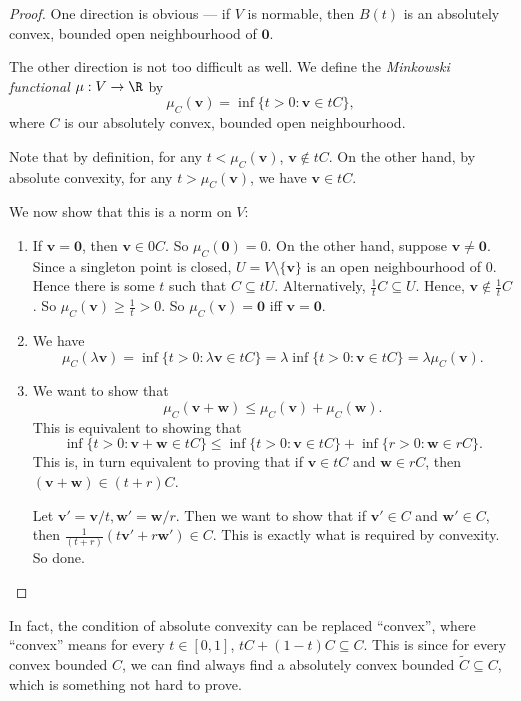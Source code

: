 \documentclass[a4paper]{article}
\begin{document}
\begin{proof}
  One direction is obvious --- if $V$ is normable, then $B(t)$ is an absolutely convex, bounded open neighbourhood of $\mathbf{0}$.

  The other direction is not too difficult as well. We define the \emph{Minkowski functional} $\mu: V \to \R$ by
  \[
    \mu_C(\mathbf{v}) = \inf \{t > 0: \mathbf{v}\in tC\},
  \]
  where $C$ is our absolutely convex, bounded open neighbourhood.

  Note that by definition, for any $t < \mu_C(\mathbf{v})$, $\mathbf{v}\not\in tC$. On the other hand, by absolute convexity, for any $t > \mu_C(\mathbf{v})$, we have $\mathbf{v}\in tC$.

  We now show that this is a norm on $V$:
  \begin{enumerate}
    \item If $\mathbf{v} = \mathbf{0}$, then $\mathbf{v}\in 0C$. So $\mu_C(\mathbf{0}) = 0$. On the other hand, suppose $\mathbf{v} \not= \mathbf{0}$. Since a singleton point is closed, $U = V\setminus \{\mathbf{v}\}$ is an open neighbourhood of $0$. Hence there is some $t$ such that $C\subseteq tU$. Alternatively, $\frac{1}{t}C \subseteq U$. Hence, $\mathbf{v}\not\in \frac{1}{t}C$. So $\mu_C (\mathbf{v}) \geq \frac{1}{t} > 0$. So $\mu_C (\mathbf{v}) = \mathbf{0}$ iff $\mathbf{v} = \mathbf{0}$.

    \item We have
      \[
        \mu_C(\lambda \mathbf{v}) = \inf \{t> 0: \lambda \mathbf{v}\in tC\} = \lambda \inf \{t > 0: \mathbf{v}\in tC\} = \lambda \mu_C(\mathbf{v}).
      \]
    \item We want to show that
      \[
        \mu_C (\mathbf{v} + \mathbf{w}) \leq \mu_C(\mathbf{v}) + \mu_C(\mathbf{w}).
      \]
      This is equivalent to showing that
      \[
        \inf\{t > 0: \mathbf{v} + \mathbf{w} \in tC\} \leq \inf\{t > 0: \mathbf{v}\in tC\} + \inf\{r > 0: \mathbf{w}\in rC\}.
      \]
      This is, in turn equivalent to proving that if $\mathbf{v}\in tC$ and $\mathbf{w}\in rC$, then $(\mathbf{v} + \mathbf{w})\in (t + r)C$.

      Let $\mathbf{v}' = \mathbf{v}/t, \mathbf{w}' = \mathbf{w}/r$. Then we want to show that if $\mathbf{v}' \in C$ and $\mathbf{w}' \in C$, then $\frac{1}{(t + r)}(t \mathbf{v}' + r \mathbf{w}') \in C$. This is exactly what is required by convexity. So done.\qedhere
  \end{enumerate}
\end{proof}
In fact, the condition of absolute convexity can be replaced ``convex'', where ``convex'' means for every $t\in [0, 1]$, $tC + (1 - t)C \subseteq C$. This is since for every convex bounded $C$, we can find always find a absolutely convex bounded $\tilde{C} \subseteq C$, which is something not hard to prove.
\end{document}
